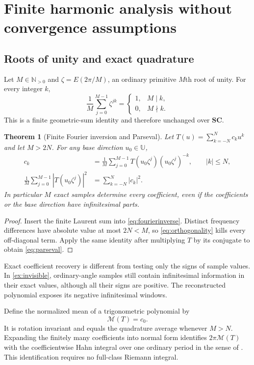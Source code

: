 \documentclass[11pt,letterpaper]{article}
\newtheorem{theorem}{Theorem}[section]
\theoremstyle{definition}
\theoremstyle{remark}
\newcommand{\SC}{\mathbf{SC}}
\newcommand{\N}{\mathbb N}\newcommand{\Z}{\mathbb Z}
\newcommand{\U}{\mathbb U}\newcommand{\PP}{\mathbb P}
\numberwithin{equation}{section}
\begin{document}
\section{Finite harmonic analysis without convergence assumptions}\label{sec:harmonic}
\subsection{Roots of unity and exact quadrature}
Let $M\in\N_{>0}$ and $\zeta=E(2\pi/M)$, an ordinary primitive $M$th root of unity. For every integer $k$,
\begin{equation}\label{eq:orthogonality}
 \frac1M\sum_{j=0}^{M-1}\zeta^{jk}
 =\begin{cases}1,&M\mid k,\\0,&M\nmid k.\end{cases}
\end{equation}
This is a finite geometric-sum identity and therefore unchanged over $\SC$.

\begin{theorem}[Finite Fourier inversion and Parseval]\label{thm:fourier}
Let $T(u)=\sum_{k=-N}^{N}c_ku^k$ and let $M>2N$. For any base direction $u_0\in\U$,
\begin{align}
 c_k&=\frac1M\sum_{j=0}^{M-1}
        T(u_0\zeta^j)(u_0\zeta^j)^{-k},\qquad |k|\le N,
 \label{eq:fourierinverse}\\
 \frac1M\sum_{j=0}^{M-1}|T(u_0\zeta^j)|^2
 &=\sum_{k=-N}^{N}|c_k|^2.\label{eq:parseval}
\end{align}
In particular $M$ exact samples determine every coefficient, even if the coefficients or the base direction have infinitesimal parts.
\end{theorem}
\begin{proof}
Insert the finite Laurent sum into \eqref{eq:fourierinverse}. Distinct frequency differences have absolute value at most $2N<M$, so \eqref{eq:orthogonality} kills every off-diagonal term. Apply the same identity after multiplying $T$ by its conjugate to obtain \eqref{eq:parseval}.
\end{proof}
Exact coefficient recovery is different from testing only the signs of sample values. In \cref{ex:invisible}, ordinary-angle samples still contain infinitesimal information in their exact values, although all their signs are positive. The reconstructed polynomial exposes its negative infinitesimal windows.

Define the normalized mean of a trigonometric polynomial by
\[
 \mathcal M(T)=c_0.
\]
It is rotation invariant and equals the quadrature average whenever $M>N$. Expanding the finitely many coefficients into normal form identifies $2\pi\mathcal M(T)$ with the coefficientwise Hahn integral over one ordinary period in the sense of \cite{SourceAnalysis}. This identification requires no full-class Riemann integral.
\end{document}
